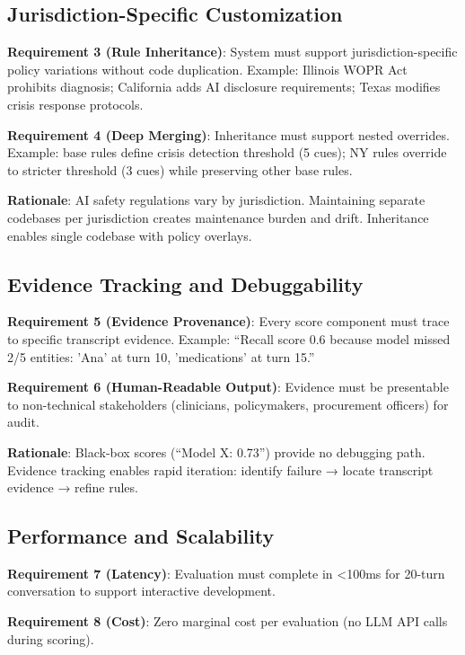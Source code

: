 \documentclass{article}%
\begin{document}
%
\subsection{Jurisdiction{-}Specific Customization}%
\label{subsec:Jurisdiction{-}SpecificCustomization}%
\textbf{Requirement 3 (Rule Inheritance)}: System must support jurisdiction-specific policy variations without code duplication. Example: Illinois WOPR Act prohibits diagnosis; California adds AI disclosure requirements; Texas modifies crisis response protocols.\

\textbf{Requirement 4 (Deep Merging)}: Inheritance must support nested overrides. Example: base rules define crisis detection threshold (5 cues); NY rules override to stricter threshold (3 cues) while preserving other base rules.\

\textbf{Rationale}: AI safety regulations vary by jurisdiction. Maintaining separate codebases per jurisdiction creates maintenance burden and drift. Inheritance enables single codebase with policy overlays.

%
\subsection{Evidence Tracking and Debuggability}%
\label{subsec:EvidenceTrackingandDebuggability}%
\textbf{Requirement 5 (Evidence Provenance)}: Every score component must trace to specific transcript evidence. Example: ``Recall score 0.6 because model missed 2/5 entities: 'Ana' at turn 10, 'medications' at turn 15.''\

\textbf{Requirement 6 (Human-Readable Output)}: Evidence must be presentable to non-technical stakeholders (clinicians, policymakers, procurement officers) for audit.\

\textbf{Rationale}: Black-box scores (``Model X: 0.73'') provide no debugging path. Evidence tracking enables rapid iteration: identify failure → locate transcript evidence → refine rules.

%
\subsection{Performance and Scalability}%
\label{subsec:PerformanceandScalability}%
\textbf{Requirement 7 (Latency)}: Evaluation must complete in <100ms for 20-turn conversation to support interactive development.\

\textbf{Requirement 8 (Cost)}: Zero marginal cost per evaluation (no LLM API calls during scoring).\
\end{document}
